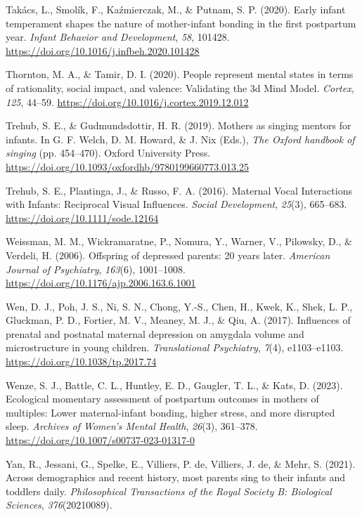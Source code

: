 \documentclass[
]{article}
\newlength{\cslhangindent}
\newenvironment{CSLReferences}[2] %
 {\begin{list}{}{%
  \setlength{\itemindent}{0pt}
  \setlength{\leftmargin}{0pt}
  \setlength{\parsep}{0pt}
  \ifodd #1
   \setlength{\leftmargin}{\cslhangindent}
   \setlength{\itemindent}{-1\cslhangindent}
  \fi
  \setlength{\itemsep}{#2\baselineskip}}}
 {\end{list}}
\begin{document}
\begin{CSLReferences}{1}{0}
Takács, L., Smolík, F., Kaźmierczak, M., \& Putnam, S. P. (2020). Early
infant temperament shapes the nature of mother-infant bonding in the
first postpartum year. \emph{Infant Behavior and Development},
\emph{58}, 101428. \url{https://doi.org/10.1016/j.infbeh.2020.101428}

Thornton, M. A., \& Tamir, D. I. (2020). People represent mental states
in terms of rationality, social impact, and valence: {Validating} the 3d
{Mind} {Model}. \emph{Cortex}, \emph{125}, 44--59.
\url{https://doi.org/10.1016/j.cortex.2019.12.012}

Trehub, S. E., \& Gudmundsdottir, H. R. (2019). Mothers as singing
mentors for infants. In G. F. Welch, D. M. Howard, \& J. Nix (Eds.),
\emph{The {Oxford} handbook of singing} (pp. 454--470). Oxford
University Press.
\url{https://doi.org/10.1093/oxfordhb/9780199660773.013.25}

Trehub, S. E., Plantinga, J., \& Russo, F. A. (2016). Maternal {Vocal}
{Interactions} with {Infants}: {Reciprocal} {Visual} {Influences}.
\emph{Social Development}, \emph{25}(3), 665--683.
\url{https://doi.org/10.1111/sode.12164}

Weissman, M. M., Wickramaratne, P., Nomura, Y., Warner, V., Pilowsky,
D., \& Verdeli, H. (2006). Offspring of depressed parents: 20 years
later. \emph{American Journal of Psychiatry}, \emph{163}(6), 1001--1008.
\url{https://doi.org/10.1176/ajp.2006.163.6.1001}

Wen, D. J., Poh, J. S., Ni, S. N., Chong, Y.-S., Chen, H., Kwek, K.,
Shek, L. P., Gluckman, P. D., Fortier, M. V., Meaney, M. J., \& Qiu, A.
(2017). Influences of prenatal and postnatal maternal depression on
amygdala volume and microstructure in young children.
\emph{Translational Psychiatry}, \emph{7}(4), e1103--e1103.
\url{https://doi.org/10.1038/tp.2017.74}

Wenze, S. J., Battle, C. L., Huntley, E. D., Gaugler, T. L., \& Kats, D.
(2023). Ecological momentary assessment of postpartum outcomes in
mothers of multiples: Lower maternal-infant bonding, higher stress, and
more disrupted sleep. \emph{Archives of Women's Mental Health},
\emph{26}(3), 361--378. \url{https://doi.org/10.1007/s00737-023-01317-0}

Yan, R., Jessani, G., Spelke, E., Villiers, P. de, Villiers, J. de, \&
Mehr, S. (2021). Across demographics and recent history, most parents
sing to their infants and toddlers daily. \emph{Philosophical
Transactions of the Royal Society B: Biological Sciences},
\emph{376}(20210089).


\end{CSLReferences}
\end{document}
